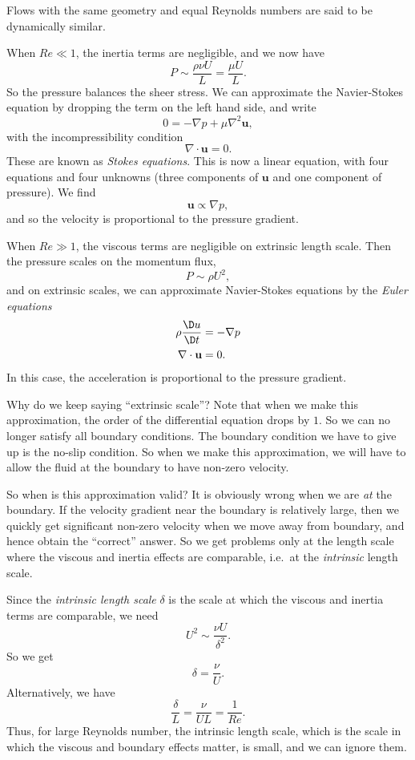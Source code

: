 \documentclass[a4paper]{article}
\begin{document}
\begin{defi}
  Flows with the same geometry and equal Reynolds numbers are said to be dynamically similar.
\end{defi}

When $Re \ll 1$, the inertia terms are negligible, and we now have
\[
  P \sim \frac{\rho\nu U}{L} = \frac{\mu U}{L}.
\]
So the pressure balances the sheer stress. We can approximate the Navier-Stokes equation by dropping the term on the left hand side, and write
\[
  0 = -\nabla p + \mu \nabla^2 \mathbf{u},
\]
with the incompressibility condition
\[
  \nabla \cdot \mathbf{u} = 0.
\]
These are known as \emph{Stokes equations}. This is now a linear equation, with four equations and four unknowns (three components of $\mathbf{u}$ and one component of pressure). We find
\[
  \mathbf{u} \propto \nabla p,
\]
and so the velocity is proportional to the pressure gradient.

When $Re \gg 1$, the viscous terms are negligible on extrinsic length scale. Then the pressure scales on the momentum flux,
\[
  P \sim \rho U^2,
\]
and on extrinsic scales, we can approximate Navier-Stokes equations by the \emph{Euler equations}
\begin{align*}
  \rho \frac{\D u}{\D t} &= - \nabla p\\
  \nabla \cdot \mathbf{u} &= 0.
\end{align*}
In this case, the acceleration is proportional to the pressure gradient.

Why do we keep saying ``extrinsic scale''? Note that when we make this approximation, the order of the differential equation drops by $1$. So we can no longer satisfy all boundary conditions. The boundary condition we have to give up is the no-slip condition. So when we make this approximation, we will have to allow the fluid at the boundary to have non-zero velocity.

So when is this approximation valid? It is obviously wrong when we are \emph{at} the boundary. If the velocity gradient near the boundary is relatively large, then we quickly get significant non-zero velocity when we move away from boundary, and hence obtain the ``correct'' answer. So we get problems only at the length scale where the viscous and inertia effects are comparable, i.e.\ at the \emph{intrinsic} length scale.

Since the \emph{intrinsic length scale} $\delta$ is the scale at which the viscous and inertia terms are comparable, we need
\[
  U^2 \sim \frac{\nu U}{\delta^2}.
\]
So we get
\[
  \delta = \frac{\nu}{U}.
\]
Alternatively, we have
\[
  \frac{\delta}{L} = \frac{\nu}{UL} = \frac{1}{Re}.
\]
Thus, for large Reynolds number, the intrinsic length scale, which is the scale in which the viscous and boundary effects matter, is small, and we can ignore them.
\end{document}
